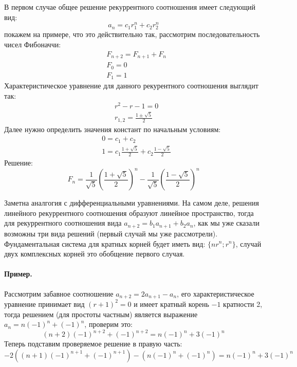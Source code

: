 В первом случае общее решение рекуррентного соотношения имеет следующий вид:
\[
	a_n = c_1 r_1^n + c_2 r_2^n
\]
покажем на примере, что это действительно так, рассмотрим последовательность чисел Фибоначчи:
\[
	\begin{split}
	& F_{n+2} = F_{n+1} + F_n \\
	& F_0 = 0 \\
	& F_1 = 1
	\end{split}
\]
Характеристическое уравнение для данного рекурентного соотношения выглядит так:
\[
	\begin{split}
		& r^2 - r - 1 = 0 \\
		& r_{1,2} = \frac{1 \pm \sqrt{5}}{2}
	\end{split}
\]
Далее нужно определить значения констант по начальным условиям:
\[
	\begin{split}
		& 0 = c_1 + c_2 \\
		& 1 = c_1 \frac{1 + \sqrt{5}}{2} + c_2 \frac{1-\sqrt{5}}{2}
	\end{split}
\]
Решение:
\[
	F_n = \frac{1}{\sqrt{5}} {\left(\frac{1+\sqrt{5}}{2}\right)}^n - \frac{1}{\sqrt{5}} {\left(\frac{1-\sqrt{5}}{2}\right)}^n
\]

Заметна аналгогия с дифференциальными уравнениями. На самом деле, решения линейного рекуррентного соотношения образуют линейное пространство, тогда для рекуррентного соотношения вида $a_{n+2} = b_1 a_{n+1} + b_2 a_n$, как мы уже сказали возможны три вида решений (первый случай мы уже рассмотрели). Фундаментальная система для кратных корней будет иметь вид: $\{nr^n; r^n\}$, случай двух комплексных корней это обобщение первого случая.

\paragraph{Пример.}
Рассмотрим забавное соотношение $a_{n+2} = 2 a_{n+1} - a_n$, его характеристическое уравнение принимает вид ${\left(r+1\right)}^2 = 0$ и имеет кратный корень $-1$ кратности 2, тогда решением (для простоты частным) является выражение $a_n = n {\left(-1\right)}^n + {\left(-1\right)}^n$, проверим это:
\[
	\left(n+2\right) {\left(-1\right)}^{n+2} + {\left(-1\right)}^{n+2} = n {\left(-1\right)}^n + 3 {\left(-1\right)}^n
\]
Теперь подставим проверяемое решение в правую часть:
\[
	-2 \left(\left(n+1\right) {\left(-1\right)}^{n+1} + {\left(-1\right)}^{n+1}\right) - \left(n {\left(-1\right)}^n + {\left(-1\right)}^n\right) = n {\left(-1\right)}^{n} + 3 {\left(-1\right)}^n
\]

